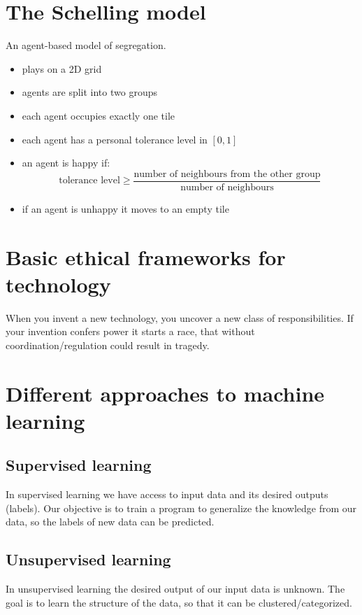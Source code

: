 \documentclass[a4paper,12pt,answers]{article}
\begin{document}
	\section{The Schelling model}
	An agent-based model of segregation.
	\begin{itemize}
		\item plays on a 2D grid
		\item agents are split into two groups
		\item each agent occupies exactly one tile
		\item each agent has a personal tolerance level in $\left[0,1 \right]$
		\item an agent is happy if:
		\[
		\text{tolerance level} \ge \frac{\text{number of neighbours from the other group}}{\text{number of neighbours}}
		\]
		
		\item if an agent is unhappy it moves to an empty tile
	\end{itemize} 
	
	

	\section{Basic ethical frameworks for technology}
	When you invent a new technology, you uncover a new class of responsibilities. If your invention confers power it starts a race, that without coordination/regulation could result in tragedy.
	
	
	
	\section{Different approaches to machine learning}
	\subsection{Supervised learning}
	In supervised learning we have access to input data and its desired outputs (labels). Our objective is to train a program to generalize the knowledge from our data, so the labels of new data can be predicted.
	
	
	\subsection{Unsupervised learning}
	In unsupervised learning the desired output of our input data is unknown. The goal is to learn the structure of the data, so that it can be clustered/categorized.
	
\end{document}
